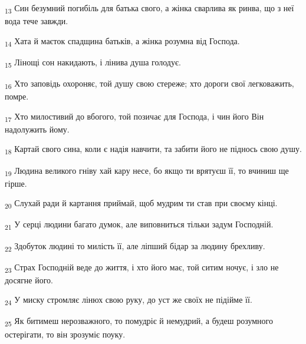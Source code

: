 \begin{tcolorbox}
\textsubscript{13} Син безумний погибіль для батька свого, а жінка сварлива як ринва, що з неї вода тече завжди.
\end{tcolorbox}
\begin{tcolorbox}
\textsubscript{14} Хата й маєток спадщина батьків, а жінка розумна від Господа.
\end{tcolorbox}
\begin{tcolorbox}
\textsubscript{15} Лінощі сон накидають, і лінива душа голодує.
\end{tcolorbox}
\begin{tcolorbox}
\textsubscript{16} Хто заповідь охороняє, той душу свою стереже; хто дороги свої легковажить, помре.
\end{tcolorbox}
\begin{tcolorbox}
\textsubscript{17} Хто милостивий до вбогого, той позичає для Господа, і чин його Він надолужить йому.
\end{tcolorbox}
\begin{tcolorbox}
\textsubscript{18} Картай свого сина, коли є надія навчити, та забити його не піднось свою душу.
\end{tcolorbox}
\begin{tcolorbox}
\textsubscript{19} Людина великого гніву хай кару несе, бо якщо ти врятуєш її, то вчиниш ще гірше.
\end{tcolorbox}
\begin{tcolorbox}
\textsubscript{20} Слухай ради й картання приймай, щоб мудрим ти став при своєму кінці.
\end{tcolorbox}
\begin{tcolorbox}
\textsubscript{21} У серці людини багато думок, але виповниться тільки задум Господній.
\end{tcolorbox}
\begin{tcolorbox}
\textsubscript{22} Здобуток людині то милість її, але ліпший бідар за людину брехливу.
\end{tcolorbox}
\begin{tcolorbox}
\textsubscript{23} Страх Господній веде до життя, і хто його має, той ситим ночує, і зло не досягне його.
\end{tcolorbox}
\begin{tcolorbox}
\textsubscript{24} У миску стромляє лінюх свою руку, до уст же своїх не підійме її.
\end{tcolorbox}
\begin{tcolorbox}
\textsubscript{25} Як битимеш нерозважного, то помудріє й немудрий, а будеш розумного остерігати, то він зрозуміє поуку.
\end{tcolorbox}
